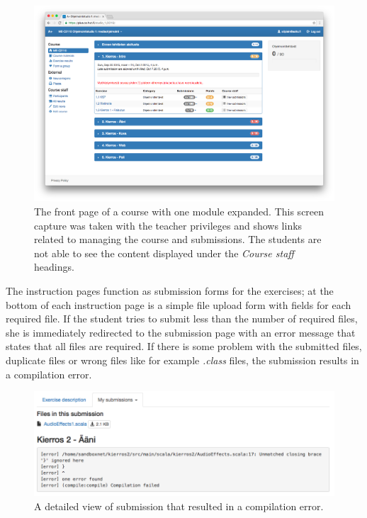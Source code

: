 \begin{figure}[t]
	\begin{center}
		\includegraphics[width=\textwidth]{images/main.png}
	\end{center}
	\caption[asdf]{\small{The front page of a course with one module expanded. This screen capture was taken with the teacher privileges and shows links related to managing the course and submissions. The students are not able to see the content displayed under the \emph{Course staff} headings.}}
	\label{figure:main}
\end{figure}

The instruction pages function as submission forms for the exercises; at the bottom of each instruction page is a simple file upload form with fields for each required file. If the student tries to submit less than the number of required files, she is immediately redirected to the submission page with an error message that states that all files are required. If there is some problem with the submitted files, duplicate files or wrong files like for example \emph{.class} files, the submission results in a compilation error.

\begin{figure}[!ht]
	\begin{center}
		\includegraphics[width=\textwidth]{images/assignment_failed.png}
	\end{center}
	\caption[asdf]{\small{A detailed view of submission that resulted in a compilation error.}}
	\label{figure:failed}
\end{figure}

